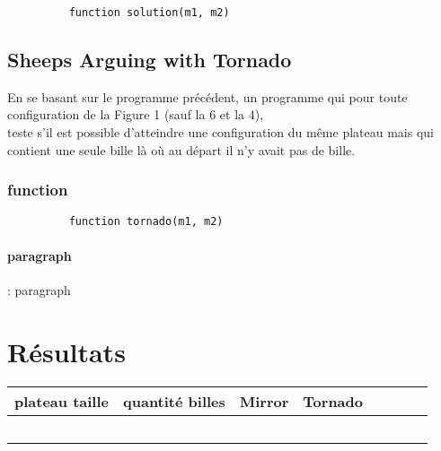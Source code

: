 \documentclass[utf8]{article}
\begin{document}
\begin{figure}[H]
\begin{minipage}{\textwidth}
  \centering	
	\begin{lstlisting}
	function solution(m1, m2) 
    \end{lstlisting}
  \label{fig:code_exemple}
\end{minipage}
\end{figure}




\subsection{ Sheeps Arguing with Tornado }
En se basant sur le programme précédent, 
un programme qui pour toute configuration de la Figure 1 (sauf la 6 et la
4), \\
teste s’il est possible d’atteindre une configuration du même plateau
mais qui contient une seule bille là où au départ il n’y avait pas de bille.\\


\subsubsection{function}

\begin{figure}[H]
\begin{minipage}{\textwidth}
  \centering	
	\begin{lstlisting}
	function tornado(m1, m2) 
    \end{lstlisting}
  \label{fig:code_exemple}
\end{minipage}
\end{figure}

\paragraph{paragraph}:
    paragraph
    
  

\section{Résultats}
\begin{center}
\begin{tabular}{|c|c|c|c|
                |c|c|c|c|}
\hline
plateau taille & quantité billes & Mirror & Tornado \\
\hline
              &                &       &\\
             &                &               & \\
             &                &               & \\
             &                &               & \\
\hline
             &                &              & \\
\hline
\end{tabular}
\end{center}
\end{document}
